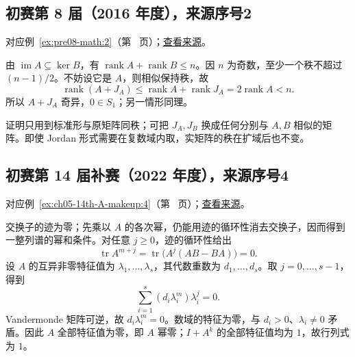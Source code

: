 \documentclass[12pt,fontset=fandol]{ctexart}
\begin{document}
\subsection{初赛第 8 届（2016 年度），来源序号2}\label{ans:pre08-math:2}\label{pr:pre08-math:2}

对应例~\ref{ex:pre08-math:2}（第~\pageref{ex:pre08-math:2} 页）；\href{https://github.com/lzxcr/cmc-mathematics/blob/64916fa1fdbc3e444a652eca204d5669058ee321/src/problems/preliminary/08/02.md}{查看来源}。

\begin{solve}

由 $\operatorname{im}A\subseteq\ker B$，有 $\operatorname{rank}A+\operatorname{rank}B\le n$。因 $n$ 为奇数，至少一个秩不超过 $(n-1)/2$。不妨设它是 $A$，则相似保持秩，故
\[
\operatorname{rank}(A+J_A)
\le\operatorname{rank}A+\operatorname{rank}J_A
=2\operatorname{rank}A<n.
\]
所以 $A+J_A$ 奇异，$0\in S_1$；另一情形同理。

\end{solve}

\begin{remark}[方法与条件]

证明只用到标准形与原矩阵同秩；可把 $J_A,J_B$ 换成任何分别与 $A,B$ 相似的矩阵。即使 Jordan 形式需要在复数域内取，实矩阵的秩在扩域后也不变。

\end{remark}

\subsection{初赛第 14 届补赛（2022 年度），来源序号4}\label{ans:ch05-14th-A-makeup:4}\label{pr:ch05-14th-A-makeup:4}

对应例~\ref{ex:ch05-14th-A-makeup:4}（第~\pageref{ex:ch05-14th-A-makeup:4} 页）；\href{https://github.com/lzxcr/cmc-mathematics/blob/64916fa1fdbc3e444a652eca204d5669058ee321/src/problems/preliminary/14-makeup/04.md}{查看来源}。

\begin{solve}

交换子的迹为零；先乘以 $A$ 的各次幂，仍能用迹的循环性消去交换子，因而得到一整列谱的幂和条件。对任意 $j\geq0$，迹的循环性给出
\[
\operatorname{tr}A^{m+j}
=\operatorname{tr}\bigl(A^j(AB-BA)\bigr)=0.
\]
设 $A$ 的互异非零特征值为 $\lambda_1,\ldots,\lambda_s$，其代数重数为 $d_1,\ldots,d_s$。取 $j=0,\ldots,s-1$，得到
\[
\sum_{i=1}^s(d_i\lambda_i^m)\lambda_i^j=0.
\]
Vandermonde 矩阵可逆，故 $d_i\lambda_i^m=0$。数域的特征为零，与 $d_i>0$、$\lambda_i\neq0$ 矛盾。因此 $A$ 全部特征值为零，即 $A$ 幂零；$I+A^k$ 的全部特征值均为 $1$，故行列式为 $1$。

\end{solve}
\end{document}

